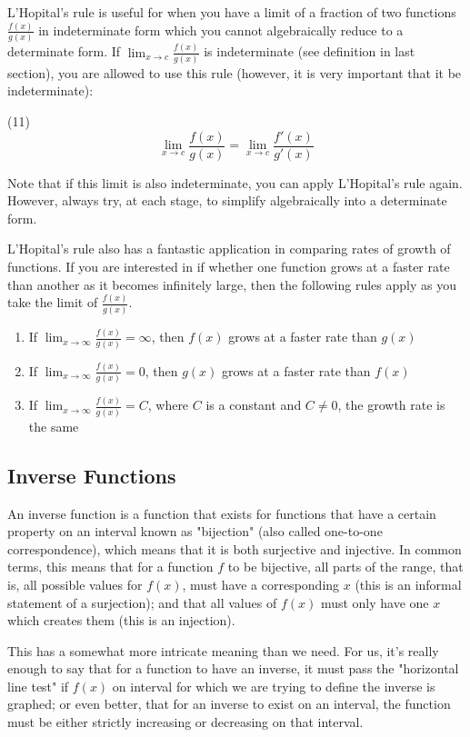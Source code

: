 \documentclass[12pt]{amsart}
\begin{document}
L'Hopital's rule is useful for when you have a limit of a fraction of two functions $\frac{f(x)}{g(x)}$ in indeterminate form which you cannot algebraically reduce to a determinate form. If $\lim_{x \to c}\frac{f(x)}{g(x)}$ is indeterminate (see definition in last section), you are allowed to use this rule (however, it is very important that it be indeterminate):

(11) $$\lim_{x \to c}\frac{f(x)}{g(x)} = \lim_{x \to c}\frac{f'(x)}{g'(x)}$$

Note that if this limit is also indeterminate, you can apply L'Hopital's rule again. However, always try, at each stage, to simplify algebraically into a determinate form.

L'Hopital's rule also has a fantastic application in comparing rates of growth of functions. If you are interested in if whether one function grows at a faster rate than another as it becomes infinitely large, then the following rules apply as you take the limit of $\frac{f(x)}{g(x)}$.

\begin{enumerate}
\item If $\lim_{x \to \infty}\frac{f(x)}{g(x)} = \infty$, then $f(x)$ grows at a faster rate than $g(x)$
\item If $\lim_{x \to \infty}\frac{f(x)}{g(x)} = 0$, then $g(x)$ grows at a faster rate than $f(x)$
\item If $\lim_{x \to \infty}\frac{f(x)}{g(x)} = C$, where $C$ is a constant and $C \neq 0$, the growth rate is the same
\end{enumerate}

\subsection{Inverse Functions}

An inverse function is a function that exists for functions that have a certain property on an interval known as "bijection" (also called one-to-one correspondence), which means that it is both surjective and injective. In common terms, this means that for a function $f$ to be bijective, all parts of the range, that is, all possible values for $f(x)$, must have a corresponding $x$ (this is an informal statement of a surjection); and that all values of $f(x)$ must only have one $x$ which creates them (this is an injection). 

This has a somewhat more intricate meaning than we need. For us, it's really enough to say that for a function to have an inverse, it must pass the "horizontal line test" if $f(x)$ on interval for which we are trying to define the inverse is graphed; or even better, that for an inverse to exist on an interval, the function must be either strictly increasing or decreasing on that interval.
\end{document}
